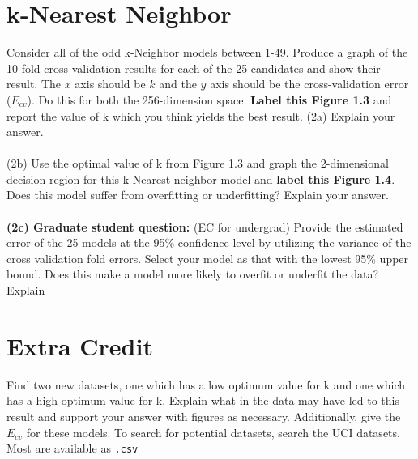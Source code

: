\documentclass[12pt]{article}
\begin{document}
\section{k-Nearest Neighbor}
Consider all of the odd k-Neighbor models between 1-49. Produce a graph of the 10-fold cross validation results for each of the 25 candidates and show their result. The $x$ axis should be $k$ and the $y$ axis should be the cross-validation error ($E_{cv}$). Do this for both the 256-dimension space. \textbf{Label this Figure 1.3} and report the value of k which you think yields the best result. (2a) Explain your answer.\\
\\
(2b) Use the optimal value of k from Figure 1.3 and graph the 2-dimensional decision region for this k-Nearest neighbor model and \textbf{label this Figure 1.4}. Does this model suffer from overfitting or underfitting? Explain your answer.\\
\\
\textbf{(2c) Graduate student question:} (EC for undergrad) Provide the estimated error of the 25 models at the 95\% confidence level by utilizing the variance of the cross validation fold errors. Select your model as that with the lowest 95\% upper bound. Does this make a model more likely to overfit or underfit the data? Explain\\
\section{Extra Credit}
Find two new datasets, one which has a low optimum value for k and one which has a high optimum value for k. Explain what in the data may have led to this result and support your answer with figures as necessary. Additionally, give the$E_{cv}$ for these models. To search for potential datasets, search the UCI datasets. Most are available as \texttt{.csv}
\end{document}
